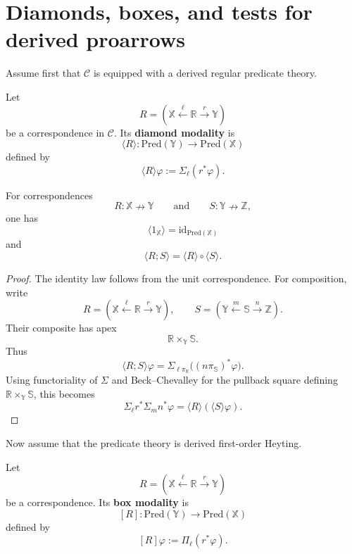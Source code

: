 \section{Diamonds, boxes, and tests for derived proarrows}
\label{sec:derived-diamonds-boxes-tests}

Assume first that \(\mathcal C\) is equipped with a derived regular predicate
theory.

\begin{definition}
\label{def:derived-diamond-correspondence}
Let
\[
R=
\left(
\mathbb X
\xleftarrow{\ell}
\mathbb R
\xrightarrow{r}
\mathbb Y
\right)
\]
be a correspondence in \(\mathcal C\). Its \textbf{diamond modality} is
\[
\langle R\rangle:
\mathrm{Pred}(\mathbb Y)\to\mathrm{Pred}(\mathbb X)
\]
defined by
\[
\langle R\rangle\varphi
:=
\Sigma_\ell(r^\ast\varphi).
\]
\end{definition}

\begin{proposition}
\label{prop:derived-diamond-functoriality}
For correspondences
\[
R:\mathbb X\nrightarrow\mathbb Y
\qquad
\text{and}
\qquad
S:\mathbb Y\nrightarrow\mathbb Z,
\]
one has
\[
\langle 1_{\mathbb X}\rangle=\mathrm{id}_{\mathrm{Pred}(\mathbb X)}
\]
and
\[
\langle R;S\rangle
=
\langle R\rangle\circ\langle S\rangle.
\]
\end{proposition}

\begin{proof}
The identity law follows from the unit correspondence. For composition, write
\[
R=(\mathbb X\xleftarrow{\ell}\mathbb R\xrightarrow{r}\mathbb Y),
\qquad
S=(\mathbb Y\xleftarrow{m}\mathbb S\xrightarrow{n}\mathbb Z).
\]
Their composite has apex
\[
\mathbb R\times_{\mathbb Y}\mathbb S.
\]
Thus
\[
\langle R;S\rangle\varphi
=
\Sigma_{\ell\pi_{\mathbb R}}
\bigl((n\pi_{\mathbb S})^\ast\varphi\bigr).
\]
Using functoriality of \(\Sigma\) and Beck--Chevalley for the pullback square
defining \(\mathbb R\times_{\mathbb Y}\mathbb S\), this becomes
\[
\Sigma_\ell r^\ast\Sigma_m n^\ast\varphi
=
\langle R\rangle(\langle S\rangle\varphi).
\]
\end{proof}

Now assume that the predicate theory is derived first-order Heyting.

\begin{definition}
\label{def:derived-box-correspondence}
Let
\[
R=
\left(
\mathbb X
\xleftarrow{\ell}
\mathbb R
\xrightarrow{r}
\mathbb Y
\right)
\]
be a correspondence. Its \textbf{box modality} is
\[
[R]:
\mathrm{Pred}(\mathbb Y)\to\mathrm{Pred}(\mathbb X)
\]
defined by
\[
[R]\varphi
:=
\Pi_\ell(r^\ast\varphi).
\]
\end{definition}

